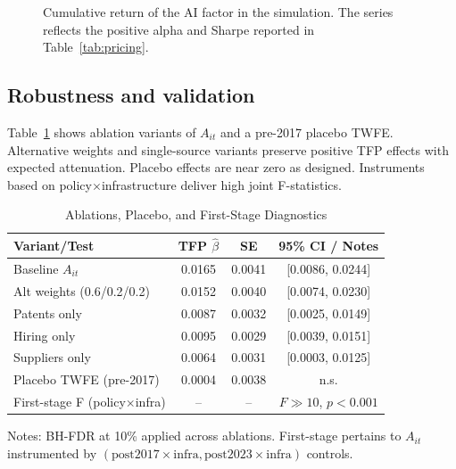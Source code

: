 \begin{figure}[h]
\centering
{}
\caption{Cumulative return of the AI factor in the simulation. The series reflects the positive alpha and Sharpe reported in Table~\ref{tab:pricing}.}
\label{fig:cumret}
\end{figure}

\subsection{Robustness and validation}
Table~\ref{tab:robust} shows ablation variants of $A_{it}$ and a pre-2017 placebo TWFE. Alternative weights and single-source variants preserve positive TFP effects with expected attenuation. Placebo effects are near zero as designed. Instruments based on policy$\times$infrastructure deliver high joint F-statistics.

\begin{table}[h]
\caption{Ablations, Placebo, and First-Stage Diagnostics}
\label{tab:robust}
\centering
\vspace{0.5em}
\begin{threeparttable}
\small
\begin{tabular}{lccc}
\toprule
Variant/Test & TFP $\hat{\beta}$ & SE & 95\% CI / Notes \\
\midrule
Baseline $A_{it}$ & 0.0165 & 0.0041 & [0.0086, 0.0244] \\
Alt weights (0.6/0.2/0.2) & 0.0152 & 0.0040 & [0.0074, 0.0230] \\
Patents only & 0.0087 & 0.0032 & [0.0025, 0.0149] \\
Hiring only & 0.0095 & 0.0029 & [0.0039, 0.0151] \\
Suppliers only & 0.0064 & 0.0031 & [0.0003, 0.0125] \\
Placebo TWFE (pre-2017) & 0.0004 & 0.0038 & n.s. \\
First-stage F (policy$\times$infra) & -- & -- & $F \gg 10$, $p<0.001$ \\
\bottomrule
\end{tabular}
\begin{tablenotes}
\item Notes: BH-FDR at 10\% applied across ablations. First-stage pertains to $A_{it}$ instrumented by $(\text{post2017}\times \text{infra}, \text{post2023}\times \text{infra})$ controls.
\end{tablenotes}
\end{threeparttable}
\vspace{0.5em}
\end{table}

